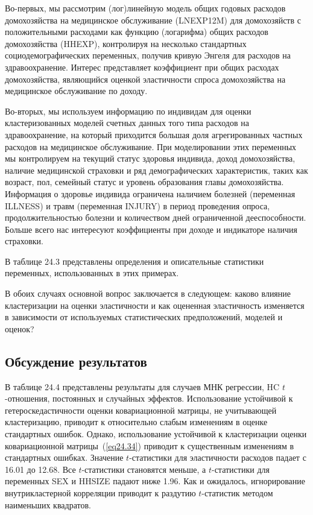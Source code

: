 Во-первых, мы рассмотрим (лог)линейную модель общих годовых расходов домохозяйства на медицинское обслуживание (LNEXP12M) для домохозяйств с положительными расходами как функцию (логарифма) общих расходов домохозяйства (HHEXP), контролируя на несколько стандартных социодемографических переменных, получив кривую Энгеля для расходов на здравоохранение. Интерес представляет коэффициент при общих расходах домохозяйства, являющийся оценкой эластичности спроса домохозяйства на медицинское обслуживание по доходу. 

Во-вторых, мы используем информацию по индивидам для оценки кластеризованных моделей счетных данных того типа расходов на здравоохранение, на который приходится большая доля агрегированных частных расходов на медицинское обслуживание. При моделировании этих переменных мы контролируем на текущий статус здоровья индивида, доход домохозяйства, наличие медицинской страховки и ряд демографических характеристик, таких как возраст, пол, семейный статус и уровень образования главы домохозяйства. Информация о здоровье индивида ограничена наличием болезней (переменная ILLNESS) и травм (переменная INJURY) в период проведения опроса, продолжительностью болезни и количеством дней ограниченной дееспособности. Больше всего нас интересуют коэффициенты при доходе и индикаторе наличия страховки. 

В таблице 24.3 представлены определения и описательные статистики переменных, использованных в этих примерах. 

В обоих случаях основной вопрос заключается в следующем: каково влияние кластеризации на оценки эластичности и как оцененная эластичность изменяется в зависимости от используемых статистических предположений, моделей и оценок? 

\subsection{Обсуждение результатов}

В таблице 24.4 представлены результаты для случаев МНК регрессии, HC $t$-отношения, постоянных и случайных эффектов. Использование устойчивой к гетероскедастичности оценки ковариационной матрицы, не учитывающей кластеризацию, приводит к относительно слабым изменениям в оценке стандартных ошибок. Однако, использование устойчивой к кластеризации оценки ковариационной матрицы~(\ref{eq24.34}) приводит к существенным изменениям в стандартных ошибках. Значение $t$-статистики для эластичности расходов падает с 16.01 до 12.68. Все $t$-статистики становятся меньше, а $t$-статистики для переменных SEX и HHSIZE падают ниже 1.96. Как и ожидалось, игнорирование внутрикластерной корреляции приводит к раздутию $t$-статистик методом наименьших квадратов. 

